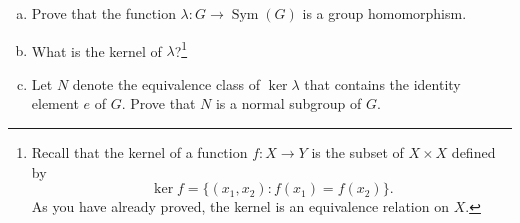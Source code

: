 \documentclass[12pt,reqno]{amsart}
\newcommand{\<}{\ensuremath{\langle}}
\renewcommand{\>}{\ensuremath{\rangle}}
\newcommand{\Sym}{\ensuremath{\operatorname{Sym}}}
\begin{document}
\bigskip

\begin{enumerate}[(a)]
\item 
Prove that the function $\lambda: G \rightarrow \Sym(G)$ is a group
homomorphism.  

\medskip

\item What is the kernel of $\lambda$?\footnote{Recall that the kernel of a function $f: X \rightarrow Y$ is the subset of
  $X\times X$ defined by 
\[
\ker f = \{(x_1,x_2) : f(x_1) = f(x_2)\}.
\]
As you have already proved, the kernel is an equivalence relation on $X$.}


\medskip

\item Let $N$ denote the equivalence class of $\ker\lambda$ that contains the
  identity element $e$ of $G$.  Prove that $N$ is a normal subgroup of $G$.
\end{enumerate}
\end{document}
